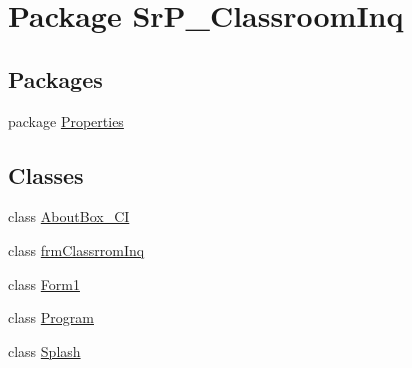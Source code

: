 \hypertarget{namespace_sr_p___classroom_inq}{
\section{\-Package \-Sr\-P\-\_\-\-Classroom\-Inq}
\label{namespace_sr_p___classroom_inq}
}
\subsection*{\-Packages}
\begin{DoxyCompactItemize}
\item 
package \hyperlink{namespace_sr_p___classroom_inq_1_1_properties}{\-Properties}
\end{DoxyCompactItemize}
\subsection*{\-Classes}
\begin{DoxyCompactItemize}
\item 
class \hyperlink{class_sr_p___classroom_inq_1_1_about_box___c_i}{\-About\-Box\-\_\-\-C\-I}
\item 
class \hyperlink{class_sr_p___classroom_inq_1_1frm_classrrom_inq}{frm\-Classrrom\-Inq}
\item 
class \hyperlink{class_sr_p___classroom_inq_1_1_form1}{\-Form1}
\item 
class \hyperlink{class_sr_p___classroom_inq_1_1_program}{\-Program}
\item 
class \hyperlink{class_sr_p___classroom_inq_1_1_splash}{\-Splash}
\end{DoxyCompactItemize}
